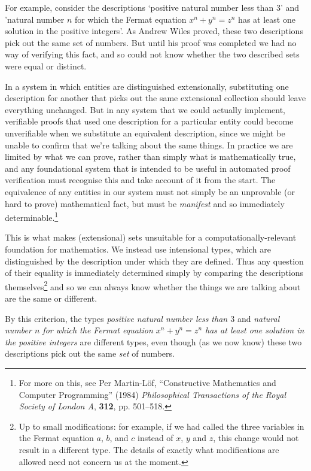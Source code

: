 For example, consider the descriptions `positive natural number less than $3$' and 'natural number $n$ for which the Fermat equation $x^n + y^n = z^n$ has at least one solution in the positive integers'.  As Andrew Wiles proved, these two descriptions pick out the same set of numbers. But until his proof was completed we had no way of verifying this fact, and so could not know whether the two described sets were equal or distinct.

In a system in which entities are distinguished extensionally, substituting  one description for another that picks out the same extensional collection should leave everything unchanged.  But in any system that we could actually implement, verifiable proofs that used one description for a particular entity could become unverifiable when we substitute an equivalent description, since we might be unable to confirm that we're talking about the same things.  In practice we are limited by what we can prove, rather than simply what is mathematically true, and any foundational system that is intended to be useful in automated proof verification must recognise this and take account of it from the start.  The equivalence of any entities in our system must not simply be an unprovable (or hard to prove) mathematical fact, but must be \emph{manifest} and so immediately determinable.\footnote{ 
For more on this, see 
Per Martin-L\"{o}f, 
``Constructive Mathematics and Computer Programming''
(1984)
\emph{Philosophical Transactions of the Royal Society of London A}, 
\textbf{312}, 
pp. 501--518.
}

This is what makes (extensional) sets unsuitable for a computationally-relevant foundation for mathematics.  We instead use intensional types, which are distinguished by the description under which they are defined.  Thus any question of their equality is immediately determined simply by comparing the descriptions themselves\footnote{
Up to small modifications: for example, if we had called the three variables in the Fermat equation $a$, $b$, and $c$ instead of $x$, $y$ and $z$, this change would not result in a different type.  The details of exactly what modifications are allowed need not concern us at the moment.
}
and so we can always know whether the things we are talking about are the same or different.

By this criterion, the types 
\emph{positive natural number less than $3$}
and
\emph{natural number $n$ for which the Fermat equation 
$x^n + y^n = z^n$ has at least one solution in the positive integers} are different types, even though (as we now know) these two descriptions pick out the same \emph{set} of numbers.

